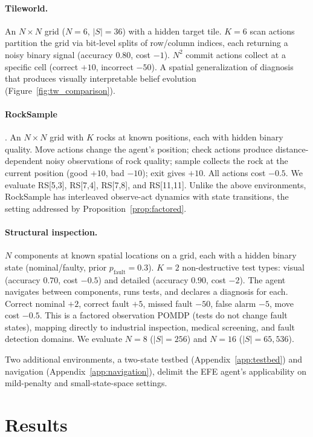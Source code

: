 \documentclass{article}
\begin{document}
\paragraph{Tileworld.} An $N{\times}N$ grid ($N{=}6$, $|S|{=}36$) with a hidden target tile. $K{=}6$ scan actions partition the grid via bit-level splits of row/column indices, each returning a noisy binary signal (accuracy $0.80$, cost $-1$). $N^2$ commit actions collect at a specific cell (correct $+10$, incorrect $-50$). A spatial generalization of diagnosis that produces visually interpretable belief evolution (Figure~\ref{fig:tw_comparison}).

\paragraph{RockSample} \citep{smith2004}. An $N{\times}N$ grid with $K$ rocks at known positions, each with hidden binary quality. Move actions change the agent's position; check actions produce distance-dependent noisy observations of rock quality; sample collects the rock at the current position (good $+10$, bad $-10$); exit gives $+10$. All actions cost $-0.5$. We evaluate RS[5,3], RS[7,4], RS[7,8], and RS[11,11]. Unlike the above environments, RockSample has interleaved observe-act dynamics with state transitions, the setting addressed by Proposition~\ref{prop:factored}.

\paragraph{Structural inspection.} $N$ components at known spatial locations on a grid, each with a hidden binary state (nominal/faulty, prior $p_{\text{fault}}{=}0.3$). $K{=}2$ non-destructive test types: visual (accuracy $0.70$, cost $-0.5$) and detailed (accuracy $0.90$, cost $-2$). The agent navigates between components, runs tests, and declares a diagnosis for each. Correct nominal $+2$, correct fault $+5$, missed fault $-50$, false alarm $-5$, move cost $-0.5$. This is a factored observation POMDP (tests do not change fault states), mapping directly to industrial inspection, medical screening, and fault detection domains. We evaluate $N{=}8$ ($|S|{=}256$) and $N{=}16$ ($|S|{=}65{,}536$).

Two additional environments, a two-state testbed (Appendix~\ref{app:testbed}) and navigation (Appendix~\ref{app:navigation}), delimit the EFE agent's applicability on mild-penalty and small-state-space settings.

\section{Results}
\end{document}

